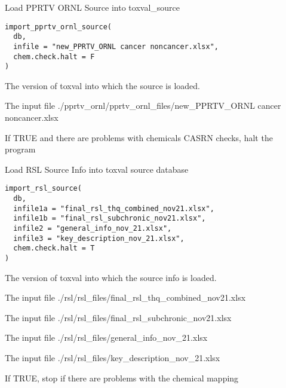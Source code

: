 \documentclass[letterpaper]{book}
\begin{document}
%
\begin{Description}\relax
Load PPRTV ORNL Source into toxval\_source
\end{Description}
%
\begin{Usage}
\begin{verbatim}
import_pprtv_ornl_source(
  db,
  infile = "new_PPRTV_ORNL cancer noncancer.xlsx",
  chem.check.halt = F
)
\end{verbatim}
\end{Usage}
%
\begin{Arguments}
\begin{ldescription}
\item[\code{db}] The version of toxval into which the source is loaded.

\item[\code{infile}] The input file ./pprtv\_ornl/pprtv\_ornl\_files/new\_PPRTV\_ORNL cancer noncancer.xlsx

\item[\code{chem.check.halt}] If TRUE and there are problems with chemicals CASRN checks, halt the program
\end{ldescription}
\end{Arguments}
%
\begin{Description}\relax
Load RSL Source Info into toxval source database
\end{Description}
%
\begin{Usage}
\begin{verbatim}
import_rsl_source(
  db,
  infile1a = "final_rsl_thq_combined_nov21.xlsx",
  infile1b = "final_rsl_subchronic_nov21.xlsx",
  infile2 = "general_info_nov_21.xlsx",
  infile3 = "key_description_nov_21.xlsx",
  chem.check.halt = T
)
\end{verbatim}
\end{Usage}
%
\begin{Arguments}
\begin{ldescription}
\item[\code{db}] The version of toxval into which the source info is loaded.

\item[\code{infile1a}] The input file ./rsl/rsl\_files/final\_rsl\_thq\_combined\_nov21.xlsx

\item[\code{infile1b}] The input file ./rsl/rsl\_files/final\_rsl\_subchronic\_nov21.xlsx

\item[\code{infile2}] The input file ./rsl/rsl\_files/general\_info\_nov\_21.xlsx

\item[\code{infile3}] The input file ./rsl/rsl\_files/key\_description\_nov\_21.xlsx

\item[\code{chem.check.halt}] If TRUE, stop if there are problems with the chemical mapping
\end{ldescription}
\end{Arguments}
\end{document}
